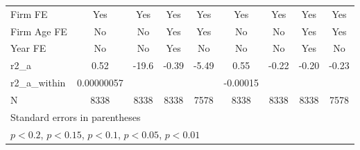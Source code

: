 {\begin{tabular}{l*{8}{c}}
\addlinespace
Firm FE             &         Yes         &         Yes         &         Yes         &         Yes         &         Yes         &         Yes         &         Yes         &         Yes         \\
\addlinespace
Firm Age FE         &          No         &          No         &         Yes         &         Yes         &          No         &          No         &         Yes         &         Yes         \\
\addlinespace
Year FE             &          No         &          No         &         Yes         &          No         &          No         &          No         &         Yes         &          No         \\
\midrule
r2\_a                &        0.52         &       -19.6         &       -0.39         &       -5.49         &        0.55         &       -0.22         &       -0.20         &       -0.23         \\
r2\_a\_within         &  0.00000057         &                     &                     &                     &    -0.00015         &                     &                     &                     \\
N                   &        8338         &        8338         &        8338         &        7578         &        8338         &        8338         &        8338         &        7578         \\
\bottomrule
\multicolumn{9}{l}{\footnotesize Standard errors in parentheses}\\
\multicolumn{9}{l}{\footnotesize \sym{++} \(p<0.2\), \sym{+} \(p<0.15\), \sym{*} \(p<0.1\), \sym{**} \(p<0.05\), \sym{***} \(p<0.01\)}\\
\end{tabular}
}
